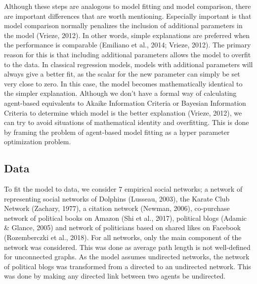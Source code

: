 \documentclass{article}
\begin{document}
Although these steps are analogous to model fitting and model comparison, there are important differences that are worth mentioning. Especially important is that model comparison normally penalizes the inclusion of additional parameters in the model (Vrieze, 2012). In other words, simple explanations are preferred when the performance is comparable (Emiliano et al., 2014; Vrieze, 2012). The primary reason for this is that including additional parameters allows the model to overfit to the data. In classical regression models, models with additional parameters will always give a better fit, as the scalar for the new parameter can simply be set very close to zero. In this case, the model becomes mathematically identical to the simpler explanation. Although we don’t have a formal way of calculating agent-based equivalents to Akaike Information Criteria or Bayesian Information Criteria to determine which model is the better explanation (Vrieze, 2012), we can try to avoid situations of mathematical identity and overfitting. This is done by framing the problem of agent-based model fitting as a hyper parameter optimization problem. 


\subsection{Data}
To fit the model to data, we consider 7 empirical social networks; a network of representing social networks of Dolphins (Lusseau, 2003), the Karate Club Network (Zachary, 1977), a citation network (Newman, 2006), co-purchase network of political books on Amazon (Shi et al., 2017), political blogs (Adamic \& Glance, 2005) and network of politicians based on shared likes on Facebook (Rozemberczki et al., 2018). For all networks, only the main component of the network was considered. This was done as average path length is not well-defined for unconnected graphs. As the model assumes undirected networks, the network of political blogs was transformed from a directed to an undirected network. This was done by making any directed link between two agents be undirected. 
\end{document}
